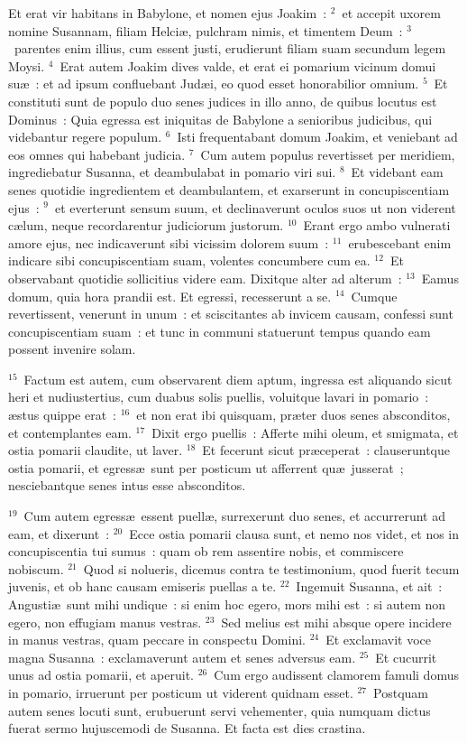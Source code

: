 \bchapter
\lettrine[lines=3,image=true,loversize=0.05,lraise=-0.03]{E}{}t erat vir habitans in Babylone, et nomen ejus Joakim~:
${}^{2}$~et accepit uxorem nomine Susannam, filiam Helci\ae , pulchram nimis, et timentem Deum~:
${}^{3}$~parentes enim illius, cum essent justi, erudierunt filiam suam secundum legem Moysi.
${}^{4}$~Erat autem Joakim dives valde, et erat ei pomarium vicinum domui su\ae~: et ad ipsum confluebant Jud\ae i, eo quod esset honorabilior omnium.
${}^{5}$~Et constituti sunt de populo duo senes judices in illo anno, de quibus locutus est Dominus~: Quia egressa est iniquitas de Babylone a senioribus judicibus, qui videbantur regere populum.
${}^{6}$~Isti frequentabant domum Joakim, et veniebant ad eos omnes qui habebant judicia.
${}^{7}$~Cum autem populus revertisset per meridiem, ingrediebatur Susanna, et deambulabat in pomario viri sui.
${}^{8}$~Et videbant eam senes quotidie ingredientem et deambulantem, et exarserunt in concupiscentiam ejus~:
${}^{9}$~et everterunt sensum suum, et declinaverunt oculos suos ut non viderent c\ae lum, neque recordarentur judiciorum justorum.
${}^{10}$~Erant ergo ambo vulnerati amore ejus, nec indicaverunt sibi vicissim dolorem suum~:
${}^{11}$~erubescebant enim indicare sibi concupiscentiam suam, volentes concumbere cum ea.
${}^{12}$~Et observabant quotidie sollicitius videre eam. Dixitque alter ad alterum~:
${}^{13}$~Eamus domum, quia hora prandii est. Et egressi, recesserunt a se.
${}^{14}$~Cumque revertissent, venerunt in unum~: et sciscitantes ab invicem causam, confessi sunt concupiscentiam suam~: et tunc in communi statuerunt tempus quando eam possent invenire solam.


${}^{15}$~Factum est autem, cum observarent diem aptum, ingressa est aliquando sicut heri et nudiustertius, cum duabus solis puellis, voluitque lavari in pomario~: \ae stus quippe erat~:
${}^{16}$~et non erat ibi quisquam, pr\ae ter duos senes absconditos, et contemplantes eam.
${}^{17}$~Dixit ergo puellis~: Afferte mihi oleum, et smigmata, et ostia pomarii claudite, ut laver.
${}^{18}$~Et fecerunt sicut pr\ae ceperat~: clauseruntque ostia pomarii, et egress\ae\ sunt per posticum ut afferrent qu\ae\ jusserat~; nesciebantque senes intus esse absconditos.


${}^{19}$~Cum autem egress\ae\ essent puell\ae , surrexerunt duo senes, et accurrerunt ad eam, et dixerunt~:
${}^{20}$~Ecce ostia pomarii clausa sunt, et nemo nos videt, et nos in concupiscentia tui sumus~: quam ob rem assentire nobis, et commiscere nobiscum.
${}^{21}$~Quod si nolueris, dicemus contra te testimonium, quod fuerit tecum juvenis, et ob hanc causam emiseris puellas a te.
${}^{22}$~Ingemuit Susanna, et ait~: Angusti\ae\ sunt mihi undique~: si enim hoc egero, mors mihi est~: si autem non egero, non effugiam manus vestras.
${}^{23}$~Sed melius est mihi absque opere incidere in manus vestras, quam peccare in conspectu Domini.
${}^{24}$~Et exclamavit voce magna Susanna~: exclamaverunt autem et senes adversus eam.
${}^{25}$~Et cucurrit unus ad ostia pomarii, et aperuit.
${}^{26}$~Cum ergo audissent clamorem famuli domus in pomario, irruerunt per posticum ut viderent quidnam esset.
${}^{27}$~Postquam autem senes locuti sunt, erubuerunt servi vehementer, quia numquam dictus fuerat sermo hujuscemodi de Susanna. Et facta est dies crastina.


